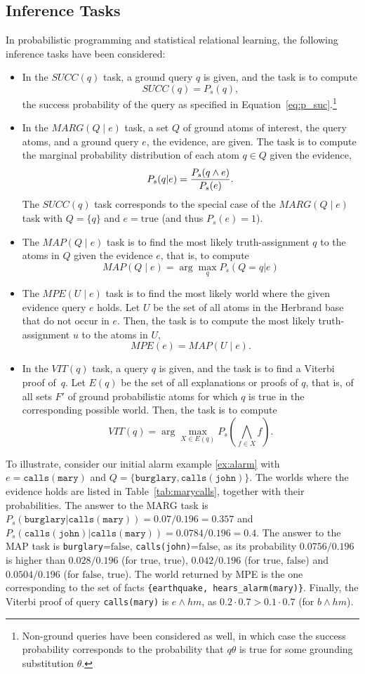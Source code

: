 \documentclass[a4paper]{article}
\newcommand{\true}{\ensuremath{\mathrm{true}}}
\newcommand{\false}{\ensuremath{\mathrm{false}}}
\begin{document}
\subsection{Inference Tasks}\label{sec:tasks}
In probabilistic programming and statistical relational learning, the following inference tasks have been considered:
\begin{itemize}
\item In the $SUCC(q)$ task, a ground query $q$ is given, and the task is to compute
$$SUCC(q) = P_s(q),$$ the success probability of the query as specified in Equation~\eqref{eq:p_suc}.\footnote{Non-ground queries have 
    been considered as well, in which case the success probability
    corresponds to the probability that $q\theta$ is true for some
    grounding substitution $\theta$.}
\item In the $MARG(Q \mid e)$ task, a set $Q$ of ground atoms of interest, the query atoms,
and a ground query $e$, the evidence, are given. 
The task is to compute the marginal probability distribution of each
atom $q\in Q$ given the evidence, 
$$P_s(q|e)  =  {{P_s(q \wedge e)}\over{P_s(e)}}.$$
The $SUCC(q)$ task corresponds to the special case of 
the $MARG(Q\mid e)$ task with $Q=\{q\}$ and $e=\true$ (and
thus $P_s(e)=1$).
\item
The $MAP(Q \mid e)$ task is to find the most likely truth-assignment $q$ to the 
atoms in $Q$ given the evidence $e$, that is, to compute
$$MAP(Q \mid e) = \arg\max_q P_s(Q=q |e)$$ 
\item
The $MPE(U \mid e)$ task is to find the most likely world where the given
evidence query $e$ holds. Let $U$ be the set of all atoms in the
Herbrand base that do not occur in $e$. Then, the task is to compute 
the most likely truth-assignment $u$ to the atoms in $U$,
$$MPE(e) = MAP(U \mid e).$$
\item
In the $VIT(q)$ task, a query $q$ is given, and the task is to find
a Viterbi proof of~$q$. Let $E(q)$ be the set of all explanations or
proofs of
$q$, that is, of all sets $F'$ of ground probabilistic atoms for which
$q$ is true in the corresponding possible world. Then, the task is to
compute
$$VIT(q) = \arg\max_{X\in E(q)} P_s(\bigwedge_{f \in  X} f).$$
\end{itemize}
To illustrate, consider our initial alarm example \eqref{ex:alarm} with 
$e=\mathtt{calls(mary)}$ and 
$Q=\{\mathtt{burglary}, \mathtt{calls(john)}\}$. The worlds  where the
evidence holds are listed in Table~\ref{tab:marycalls}, together with
their probabilities. 
The answer to the
MARG 
task 
is $P_s(\mathtt{burglary}|\mathtt{calls(mary)}) = 0.07/0.196 = 0.357$ and
$P_s(\mathtt{calls(john)}|\mathtt{calls(mary)}) = 0.0784/0.196=0.4$. The answer to the MAP
task is \verb|burglary|=\false, \verb|calls(john)|=\false, as its
probability $0.0756/0.196$ is higher than $0.028/0.196$ (for \true, \true), $0.042/0.196$
(for \true, \false) and $0.0504/0.196$ (for \false, \true). The world returned by MPE is the one corresponding
to the set of facts \verb|{earthquake, hears_alarm(mary)}|. Finally,
the Viterbi proof of query \verb|calls(mary)| is $e\wedge hm$, as $0.2\cdot
0.7 > 0.1\cdot 0.7$ (for $b\wedge hm$). 
\end{document}
